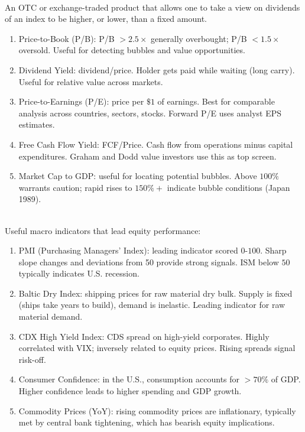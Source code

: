 \documentclass[a4paper,oneside,openany]{book}
\begin{document}
\begin{remark} \\
An OTC or exchange-traded product that allows one to take a view on dividends of an index to be higher, or lower, than a fixed amount. 
\end{remark}

\begin{remark} 
\begin{enumerate}[label=\roman*.]
\setlength{\itemsep}{0pt}
\item Price-to-Book (P/B): P/B $> 2.5\times$ generally overbought; P/B $< 1.5\times$ oversold. Useful for detecting bubbles and value opportunities.
\item Dividend Yield: dividend/price. Holder gets paid while waiting (long carry). Useful for relative value across markets.
\item Price-to-Earnings (P/E): price per $\$1$ of earnings. Best for comparable analysis across countries, sectors, stocks. Forward P/E uses analyst EPS estimates.
\item Free Cash Flow Yield: FCF/Price. Cash flow from operations minus capital expenditures. Graham and Dodd value investors use this as top screen.
\item Market Cap to GDP: useful for locating potential bubbles. Above $100\%$ warrants caution; rapid rises to $150\%+$ indicate bubble conditions (Japan 1989).
\end{enumerate}
\end{remark}

\begin{remark} \\
Useful macro indicators that lead equity performance:
\begin{enumerate}[label=\roman*.]
\setlength{\itemsep}{0pt}
\item PMI (Purchasing Managers' Index): leading indicator scored $0$-$100$. Sharp slope changes and deviations from 50 provide strong signals. ISM below $50$ typically indicates U.S. recession.
\item Baltic Dry Index: shipping prices for raw material dry bulk. Supply is fixed (ships take years to build), demand is inelastic. Leading indicator for raw material demand.
\item CDX High Yield Index: CDS spread on high-yield corporates. Highly correlated with VIX; inversely related to equity prices. Rising spreads signal risk-off.
\item Consumer Confidence: in the U.S., consumption accounts for $>70\%$ of GDP. Higher confidence leads to higher spending and GDP growth.
\item Commodity Prices (YoY): rising commodity prices are inflationary, typically met by central bank tightening, which has bearish equity implications.
\end{enumerate}
\end{remark}
\end{document}
